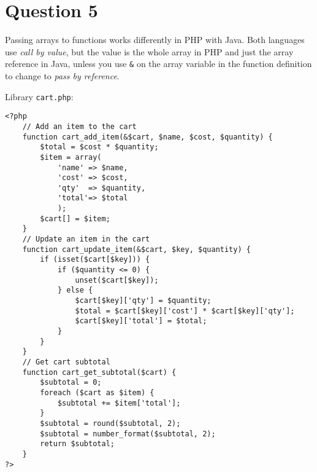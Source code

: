 
\section*{Question 5}

Passing arrays to functions works differently in PHP with Java. Both languages use \textit{call by value}, but the value is the whole array in PHP and just the array reference in Java, unless you use \texttt{\&} on the array variable in the function definition to change to \textit{pass by reference}.

Library \texttt{cart.php}:
\lstset{language=php, tabsize=2}
\begin{lstlisting}
<?php
	// Add an item to the cart
	function cart_add_item(&$cart, $name, $cost, $quantity) {
		$total = $cost * $quantity;
		$item = array(
			'name' => $name,
			'cost' => $cost,
			'qty'  => $quantity,
			'total'=> $total
			);
		$cart[] = $item;
	}
	// Update an item in the cart
	function cart_update_item(&$cart, $key, $quantity) {
		if (isset($cart[$key])) {
			if ($quantity <= 0) {
				unset($cart[$key]);
			} else {
				$cart[$key]['qty'] = $quantity;
				$total = $cart[$key]['cost'] * $cart[$key]['qty'];
				$cart[$key]['total'] = $total;
			}
		}
	}
	// Get cart subtotal
	function cart_get_subtotal($cart) {
		$subtotal = 0;
		foreach ($cart as $item) {
			$subtotal += $item['total'];
		}
		$subtotal = round($subtotal, 2);
		$subtotal = number_format($subtotal, 2);
		return $subtotal;
	}
?>
\end{lstlisting}

